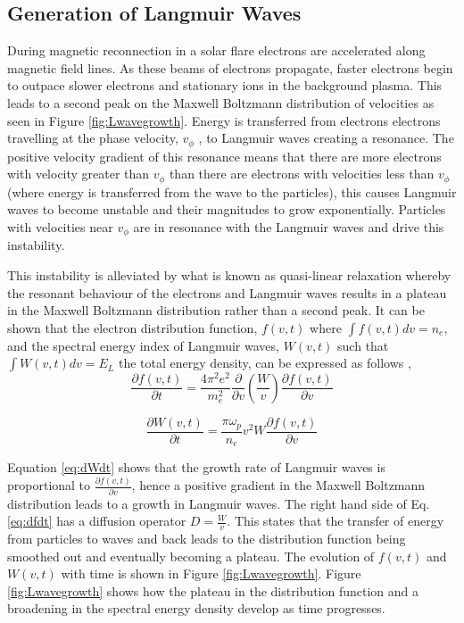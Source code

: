 \subsection{Generation of Langmuir Waves}
During magnetic reconnection in a solar flare electrons are accelerated along magnetic field lines. As these beams of electrons propagate, faster electrons begin to outpace slower electrons and stationary ions in the background plasma. This leads to a second peak on the Maxwell Boltzmann distribution of velocities as seen in Figure \ref{fig:Lwavegrowth}. Energy is transferred from electrons electrons travelling at the phase velocity, $v_{\phi}$ , to Langmuir waves creating a resonance.
The positive velocity gradient of this resonance means that there are more electrons with velocity greater than $v_{\phi}$ than there are electrons with velocities less than  $v_{\phi}$ (where energy is transferred from the wave to the particles), this causes Langmuir waves to become unstable and their magnitudes to grow exponentially. Particles with velocities near $v_{\phi}$ are in resonance with the Langmuir waves and drive this instability.

This instability is alleviated by what is known as quasi-linear relaxation \citep{Melrose1987} whereby the resonant behaviour of the electrons and Langmuir waves results in a plateau in the Maxwell Boltzmann distribution rather than a second peak. It can be shown that \citep{Vedenov1963} the electron distribution function, $f(v,t)$ where $\int f(v,t) dv = n_e$, and the spectral energy index of Langmuir waves, $W(v,t)$ such that $\int W(v,t) dv = E_L$ the total energy density, can be expressed as follows \citep{Reid2014},
\begin{equation}\label{eq:dfdt}
    \frac{\partial f(v,t)}{\partial t}=\frac{4 \pi^2 e^2}{m_e^2} \frac{\partial}{\partial v} \left( \frac{W}{v} \right) \frac{\partial f(v,t)}{\partial v}
\end{equation}

\begin{equation}\label{eq:dWdt}
    \frac{\partial W(v,t)}{\partial t}= \frac{\pi \omega_p}{n_e} v^2 W \frac{\partial f(v,t)}{\partial v}
\end{equation}

Equation \ref{eq:dWdt} shows that the growth rate of Langmuir waves is proportional to $\frac{\partial f(v,t)}{\partial v}$, hence a positive gradient in the Maxwell Boltzmann distribution leads to a growth in Langmuir waves. The right hand side of Eq. \ref{eq:dfdt} has a diffusion operator $D=\frac{W}{v}$. This states that the transfer of energy from particles to waves and back leads to the distribution function being smoothed out and eventually becoming a plateau. The evolution of $f(v,t)$ and $W(v,t)$ with time is shown in Figure \ref{fig:Lwavegrowth}. Figure \ref{fig:Lwavegrowth} shows how the plateau in the distribution function and a broadening in the spectral energy density develop as time progresses.

